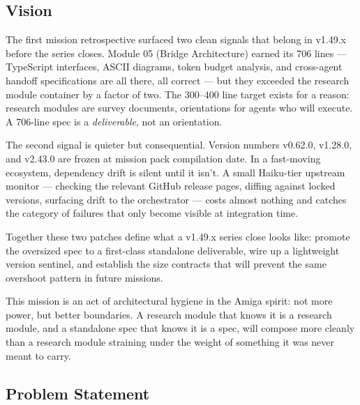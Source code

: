 \documentclass[11pt,letterpaper]{article}
\begin{document}
\subsection{Vision}

The first mission retrospective surfaced two clean signals that belong in v1.49.x before the series closes. Module 05 (Bridge Architecture) earned its 706 lines --- TypeScript interfaces, ASCII diagrams, token budget analysis, and cross-agent handoff specifications are all there, all correct --- but they exceeded the research module container by a factor of two. The 300--400 line target exists for a reason: research modules are survey documents, orientations for agents who will execute. A 706-line spec is a \emph{deliverable}, not an orientation.

The second signal is quieter but consequential. Version numbers v0.62.0, v1.28.0, and v2.43.0 are frozen at mission pack compilation date. In a fast-moving ecosystem, dependency drift is silent until it isn't. A small Haiku-tier upstream monitor --- checking the relevant GitHub release pages, diffing against locked versions, surfacing drift to the orchestrator --- costs almost nothing and catches the category of failures that only become visible at integration time.

Together these two patches define what a v1.49.x series close looks like: promote the oversized spec to a first-class standalone deliverable, wire up a lightweight version sentinel, and establish the size contracts that will prevent the same overshoot pattern in future missions.

This mission is an act of architectural hygiene in the Amiga spirit: not more power, but better boundaries. A research module that knows it is a research module, and a standalone spec that knows it is a spec, will compose more cleanly than a research module straining under the weight of something it was never meant to carry.

\subsection{Problem Statement}
\end{document}

